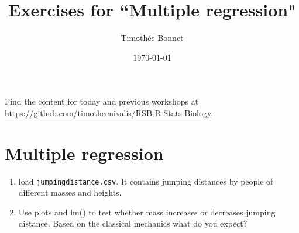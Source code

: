 \documentclass[12pt,a4paper]{scrartcl}\usepackage[]{graphicx}\usepackage[]{color}
\title{Exercises for ``Multiple regression"}
\date{\today}
\author{Timoth\'ee Bonnet}
\begin{document}
\maketitle

Find the content for today and previous workshops at \href{https://github.com/timotheenivalis/RSB-R-Stats-Biology}{https://github.com/timotheenivalis/RSB-R-Stats-Biology}.

\tableofcontents
\ListOfExerciseInToc
{}

\clearpage 

\section{Multiple regression}

\begin{Exercise}[difficulty=1, title={Jumping}]
  \begin{enumerate}
    \item load \texttt{jumpingdistance.csv}. It contains jumping distances by people of different masses and heights. 
    \item Use plots and lm() to test whether mass increases or decreases jumping distance. Based on the classical mechanics what do you expect?
  \end{enumerate}


\end{Exercise}
\end{document}
